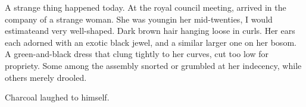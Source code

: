 \begin{diary}%
  \diarystamp{\dateTantorMeetsTakestsha}
  
  \new
  A strange thing happened today. 
  At the royal council meeting,  arrived in the company of a strange woman. 
  She was young\dash in her mid-twenties, I would estimate\dash and very well-shaped. 
  Dark brown hair hanging loose in curls. Her ears each adorned with an exotic black jewel, and a similar larger one on her bosom. 
  A green-and-black dress that clung tightly to her curves, cut too low for propriety. 
  Some among the assembly snorted or grumbled at her indecency, while others merely drooled. 
\end{diary}







\noindent
Charcoal laughed to himself. 







